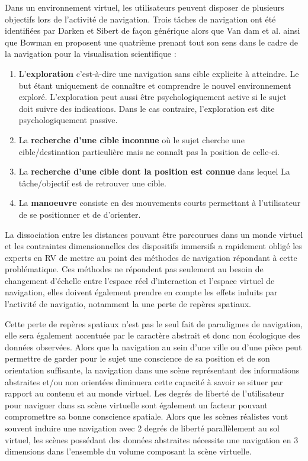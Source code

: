 Dans un environnement virtuel, les utilisateurs peuvent disposer de plusieurs objectifs lors de l'activité de navigation. Trois tâches de navigation ont été identifiées par Darken et Sibert \cite{darken1996navigating} de façon générique alors que Van dam et al. \cite{van_dam_immersive_2000} ainsi que Bowman \cite{bowman_doug_a_3d_2002} en proposent une quatrième prenant tout son sens dans le cadre de la navigation pour la visualisation scientifique :

\begin{enumerate}
  \item  L'\textbf{exploration} c’est-à-dire une navigation sans cible explicite à atteindre. Le but étant uniquement de connaître et comprendre le nouvel environnement exploré. L’exploration peut aussi être psychologiquement active si le sujet doit suivre des indications. Dans le cas contraire, l’exploration est dite psychologiquement passive.
  \item La \textbf{recherche d'une cible inconnue} où le sujet cherche une cible/destination particulière mais ne connaît pas la position de celle-ci.
  \item La \textbf{recherche d'une cible dont la position est connue} dans lequel La tâche/objectif est de retrouver une cible.
  \item La \textbf{manoeuvre} consiste en des mouvements courts permettant à l'utilisateur de se positionner et de d'orienter.
\end{enumerate}


La dissociation entre les distances pouvant être parcourues dans un monde virtuel et les contraintes dimensionnelles des dispositifs immersifs a rapidement obligé les experts en RV de mettre au point des méthodes de navigation répondant à cette problématique. Ces méthodes ne répondent pas seulement au besoin de changement d'échelle entre l'espace réel d'interaction et l'espace virtuel de navigation, elles doivent également prendre en compte les effets induits par l'activité de navigatio,  notamment la une perte de repères spatiaux.  

Cette perte de repères spatiaux n'est pas le seul fait de paradigmes de navigation, elle sera également accentuée par le caractère abstrait et donc non écologique des données observées. Alors que la navigation au sein d'une ville ou d'une pièce peut permettre de garder pour le sujet une conscience de sa position et de son orientation suffisante, la navigation dans une scène représentant des informations abstraites et/ou non orientées diminuera cette capacité à savoir se situer par rapport au contenu et au monde virtuel. Les degrés de liberté de l'utilisateur pour naviguer dans sa scène virtuelle sont également un facteur pouvant compromettre sa bonne conscience spatiale. Alors que les scènes réalistes vont souvent induire une navigation avec 2 degrés de liberté parallèlement au sol virtuel, les scènes possédant des données abstraites nécessite une navigation en 3 dimensions dans l'ensemble du volume composant la scène virtuelle. 

